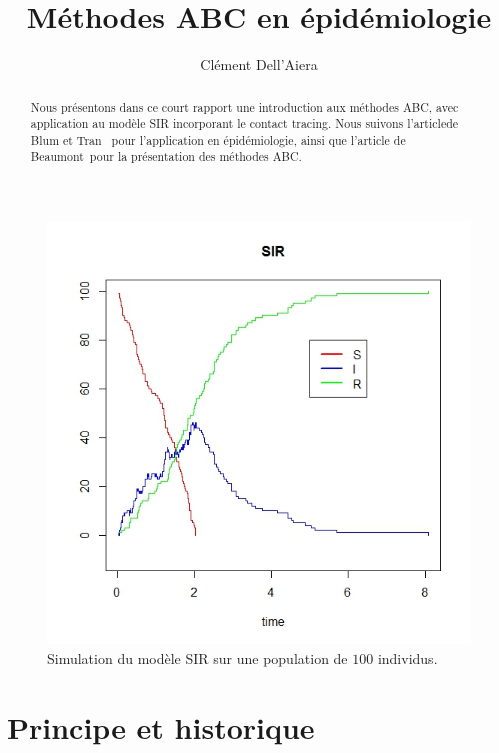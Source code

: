 \documentclass{article}
\title{Méthodes ABC en épidémiologie}
\author{ Cl\'ement Dell'Aiera}
\date{}
\theoremstyle{definition}
\begin{document}
\maketitle

\begin{abstract}
Nous présentons dans ce court rapport une introduction aux méthodes ABC, avec application au modèle SIR incorporant le contact tracing. Nous suivons l'articlede Blum et Tran~\cite{BlumTran} pour l'application en épidémiologie, ainsi que l'article de Beaumont~\cite{Beaumont}pour la présentation des méthodes ABC.
\end{abstract}

\begin{figure}[!h]\centering
\includegraphics[scale=0.6]{SIR1.jpeg}
\caption{Simulation du modèle SIR sur une population de $100$ individus.}
\label{SIRCT}
\end{figure}

\newpage
\tableofcontents

\newpage

\setlength{\parindent}{0cm}

\section{Principe et historique}
\end{document}
